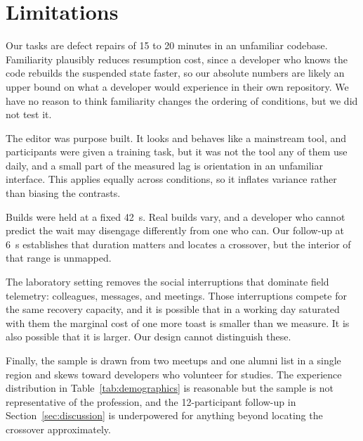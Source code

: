 \section{Limitations}
\label{sec:limitations}

Our tasks are defect repairs of 15 to 20 minutes in an unfamiliar codebase.
Familiarity plausibly reduces resumption cost, since a developer who knows the
code rebuilds the suspended state faster, so our absolute numbers are likely an
upper bound on what a developer would experience in their own repository. We
have no reason to think familiarity changes the ordering of conditions, but we
did not test it.

The editor was purpose built. It looks and behaves like a mainstream tool, and
participants were given a training task, but it was not the tool any of them
use daily, and a small part of the measured lag is orientation in an unfamiliar
interface. This applies equally across conditions, so it inflates variance
rather than biasing the contrasts.

Builds were held at a fixed 42~s. Real builds vary, and a developer who cannot
predict the wait may disengage differently from one who can. Our follow-up at
6~s establishes that duration matters and locates a crossover, but the interior
of that range is unmapped.

The laboratory setting removes the social interruptions that dominate field
telemetry: colleagues, messages, and meetings. Those interruptions compete for
the same recovery capacity, and it is possible that in a working day saturated
with them the marginal cost of one more toast is smaller than we measure. It is
also possible that it is larger. Our design cannot distinguish these.

Finally, the sample is drawn from two meetups and one alumni list in a single
region and skews toward developers who volunteer for studies. The experience
distribution in Table~\ref{tab:demographics} is reasonable but the sample is
not representative of the profession, and the 12-participant follow-up in
Section~\ref{sec:discussion} is underpowered for anything beyond locating the
crossover approximately.
